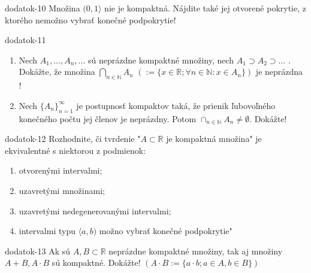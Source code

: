 \begin{defproblem}{dodatok-10}
Množina $(0,1 \rangle$ nie je kompaktná. Nájdite také jej otvorené pokrytie, z ktorého nemožno vybrať konečné podpokrytie!
\end{defproblem}

\begin{defproblem}{dodatok-11}
\begin{enumerate}
\item Nech $A_1,...,A_n,...$ sú neprázdne kompaktné množiny, nech $A_1 \supset A_2 \supset ...$ . Dokážte, že množina $\bigcap_{n \in \mathbb{N}}A_n$  $(:=\{x \in \mathbb{R}; \forall n \in \mathbb{N}: x \in A_n\})$ je neprázdna !
\item Nech ${\{A_n\}}_{n=1}^\infty$ je postupnosť kompaktov taká, že prienik ľubovoľného konečného počtu jej členov je neprázdny. Potom $\cap_{n \in \mathbb{N}} A_n \neq \emptyset$. Dokážte!
\end{enumerate}
\end{defproblem}

\begin{defproblem}{dodatok-12}
Rozhodnite, či tvrdenie "$A \subset \mathbb{R}$ je kompaktná množina" je ekvivalentné s niektorou z podmienok:
\begin{enumerate}
\item otvorenými intervalmi;
\item uzavretými množinami;
\item uzavretými nedegenerovanými intervalmi;
\item intervalmi typu $\langle a,b)$
možno vybrať konečné podpokrytie"
\end{enumerate}
\end{defproblem}

\begin{defproblem}{dodatok-13}
Ak sú $A,B \subset \mathbb{R}$ neprázdne kompaktné množiny, tak aj množiny $A+B,A \cdot B$ sú kompaktné. Dokážte! $(A \cdot B :=\{a \cdot b; a \in A, b \in B\})$
\end{defproblem}